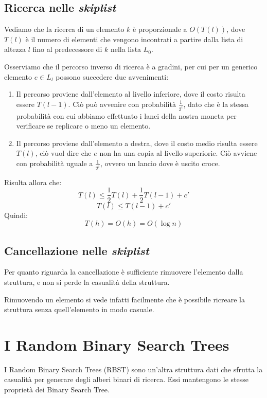 \documentclass[a4paper,11pt]{book}
\begin{document}
\subsection{Ricerca nelle \emph{skiplist}}

Vediamo che la ricerca di un elemento $k$ \`e proporzionale a $O(T(l))$, dove $T(l)$ \`e il numero di elementi che vengono incontrati a partire dalla lista di altezza $l$ fino al predecessore di $k$ nella lista $L_0$.

Osserviamo che il percorso inverso di ricerca \`e a gradini, per cui per un generico elemento $e \in L_l$ possono succedere due avvenimenti:
\begin{enumerate}
\item Il percorso proviene dall'elemento al livello inferiore, dove il costo risulta essere $T(l-1)$. Ci\`o pu\`o avvenire con probabilit\`a $\frac{1}{2^i}$, dato che \`e la stessa probabilit\`a con cui abbiamo effettuato i lanci della nostra moneta per verificare se replicare o meno un elemento.
\item Il percorso proviene dall'elemento a destra, dove il costo medio risulta essere $T(l)$, ci\`o vuol dire che $e$ non ha una copia al livello superiorie. Ci\`o avviene con probabilit\`a uguale a $\frac{1}{2^i}$, ovvero un lancio dove \`e uscito croce.
\end{enumerate}

Risulta allora che: $$T(l) \leq \frac{1}{2}T(l) + \frac{1}{2}T(l-1) + c'$$
$$T(l) \leq T(l-1) + c'$$
Quindi:
$$T(h) = O(h) = O(\log n)$$

\subsection{Cancellazione nelle \emph{skiplist}}

Per quanto riguarda la cancellazione \`e sufficiente rimuovere l'elemento dalla struttura, e non si perde la casualit\`a della struttura.

Rimuovendo un elemento si vede infatti facilmente che \`e possibile ricreare la struttura senza quell'elemento in modo casuale.

\section{I Random Binary Search Trees}

I Random Binary Search Trees (RBST) sono un'altra struttura dati che sfrutta la casualit\`a per generare degli alberi binari di ricerca. Essi mantengono le stesse propriet\`a dei Binary Search Tree.
\end{document}

